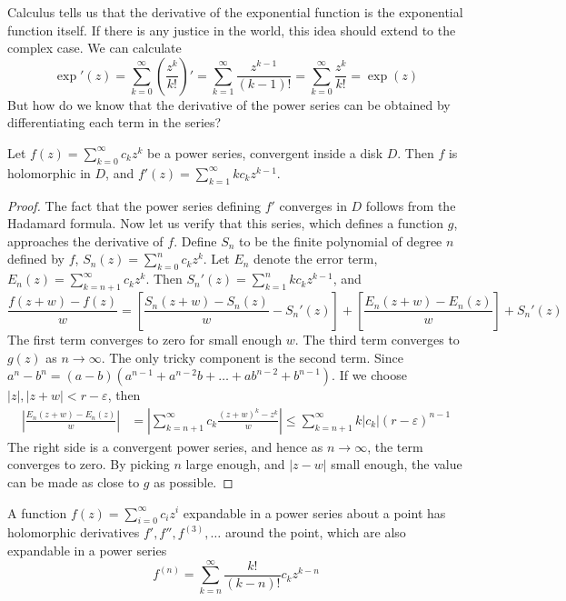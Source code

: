 Calculus tells us that the derivative of the exponential function is the exponential function itself. If there is any justice in the world, this idea should extend to the complex case. We can calculate
%
\[ \exp'(z) = \sum_{k = 0}^\infty \left( \frac{z^k}{k!} \right)' = \sum_{k = 1}^\infty \frac{z^{k-1}}{(k-1)!} = \sum_{k = 0}^\infty \frac{z^k}{k!} = \exp(z) \]
%
But how do we know that the derivative of the power series can be obtained by differentiating each term in the series?

\begin{theorem}
    Let $f(z) = \sum_{k = 0}^\infty c_k z^k$ be a power series, convergent inside a disk $D$. Then $f$ is holomorphic in $D$, and $f'(z) = \sum_{k = 1}^\infty k c_k z^{k-1}$.
\end{theorem}
\begin{proof}
    The fact that the power series defining $f'$ converges in $D$ follows from the Hadamard formula. Now let us verify that this series, which defines a function $g$, approaches the derivative of $f$. Define $S_n$ to be the finite polynomial of degree $n$ defined by $f$, $S_n(z) = \sum_{k = 0}^n c_k z^k$. Let $E_n$ denote the error term, $E_n(z) = \sum_{k = n+1}^\infty c_k z^k$. Then $S_n'(z) = \sum_{k = 1}^n k c_k z^{k-1}$, and
    \[ \frac{f(z + w) - f(z)}{w} = \left[ \frac{S_n(z + w) - S_n(z)}{w} - S_n'(z) \right] + \left[ \frac{E_n(z + w) - E_n(z)}{w} \right] + S_n'(z) \]
    The first term converges to zero for small enough $w$. The third term converges to $g(z)$ as $n \to \infty$. The only tricky component is the second term. Since $a^n - b^n = (a - b)(a^{n-1} + a^{n-2}b + \dots + ab^{n-2} + b^{n-1})$. If we choose $|z|, |z + w| < r - \varepsilon$, then
    \begin{align*}
        \left| \frac{E_n(z + w) - E_n(z)}{w} \right| &= \left| \sum_{k = n + 1}^\infty c_k \frac{(z + w)^k - z^k}{w} \right| \leq \sum_{k = n + 1}^\infty k |c_k| (r - \varepsilon)^{n-1}
    \end{align*}
    The right side is a convergent power series, and hence as $n \to \infty$, the term converges to zero. By picking $n$ large enough, and $|z - w|$ small enough, the value can be made as close to $g$ as possible.
\end{proof}

\begin{corollary}
    A function $f(z) = \sum_{i = 0}^\infty c_i z^i$ expandable in a power series about a point has holomorphic derivatives $f', f'', f^{(3)}, \dots$ around the point, which are also expandable in a power series
    \[ f^{(n)} = \sum_{k = n}^\infty \frac{k!}{(k - n)!} c_k z^{k-n} \]
\end{corollary}

